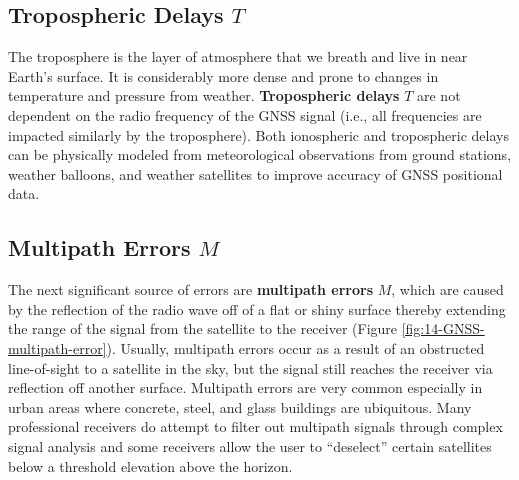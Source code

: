 \documentclass[
]{book}
\begin{document}
\subsection{\texorpdfstring{Tropospheric Delays \(T\)}{Tropospheric Delays T}}\label{tropospheric-delays-t}

The troposphere is the layer of atmosphere that we breath and live in near Earth's surface. It is considerably more dense and prone to changes in temperature and pressure from weather. \textbf{Tropospheric delays} \(T\) are not dependent on the radio frequency of the GNSS signal (i.e., all frequencies are impacted similarly by the troposphere). Both ionospheric and tropospheric delays can be physically modeled from meteorological observations from ground stations, weather balloons, and weather satellites to improve accuracy of GNSS positional data.

\subsection{\texorpdfstring{Multipath Errors \(M\)}{Multipath Errors M}}\label{multipath-errors-m}

The next significant source of errors are \textbf{multipath errors} \(M\), which are caused by the reflection of the radio wave off of a flat or shiny surface thereby extending the range of the signal from the satellite to the receiver (Figure \ref{fig:14-GNSS-multipath-error}). Usually, multipath errors occur as a result of an obstructed line-of-sight to a satellite in the sky, but the signal still reaches the receiver via reflection off another surface. Multipath errors are very common especially in urban areas where concrete, steel, and glass buildings are ubiquitous. Many professional receivers do attempt to filter out multipath signals through complex signal analysis and some receivers allow the user to ``deselect'' certain satellites below a threshold elevation above the horizon.
\end{document}
